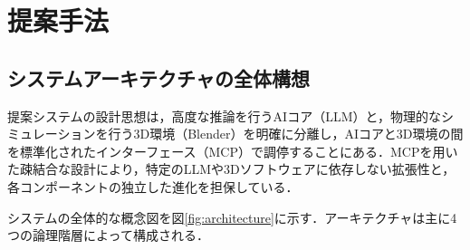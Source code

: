 \documentclass[dvipdfmx, a4paper, 9pt]{deimj}
\begin{document}
\section{提案手法}

\subsection{システムアーキテクチャの全体構想}

提案システムの設計思想は，高度な推論を行うAIコア（LLM）と，物理的なシミュレーションを行う3D環境（Blender\cite{community2018blender}）を明確に分離し，AIコアと3D環境の間を標準化されたインターフェース（MCP）で調停することにある．MCPを用いた疎結合な設計により，特定のLLMや3Dソフトウェアに依存しない拡張性と，各コンポーネントの独立した進化を担保している．

システムの全体的な概念図を図\ref{fig:architecture}に示す．アーキテクチャは主に4つの論理階層によって構成される．
\end{document}
